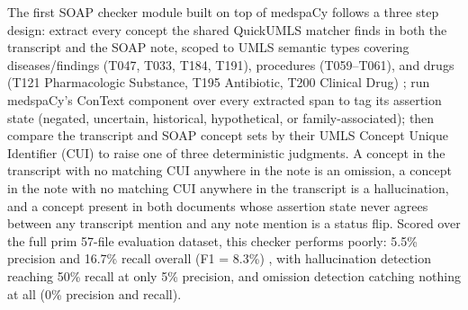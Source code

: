 \documentclass[11pt,a4paper]{article}
\begin{document}
The first SOAP checker module built on top of medspaCy follows a three step design: extract every concept the shared QuickUMLS matcher finds in both the transcript and the SOAP note, scoped to UMLS semantic types covering diseases/findings (T047, T033, T184, T191), procedures (T059–T061), and drugs (T121 Pharmacologic Substance, T195 Antibiotic, T200 Clinical Drug) \cite{soldaini2016quickumls} ; run medspaCy's ConText component over every extracted span to tag its assertion state (negated, uncertain, historical, hypothetical, or family-associated); then compare the transcript and SOAP concept sets by their UMLS Concept Unique Identifier (CUI) to raise one of three deterministic judgments.
A concept in the transcript with no matching CUI anywhere in the note is an omission,
a concept in the note with no matching CUI anywhere in the transcript is a hallucination, and a concept present in both documents whose assertion state never agrees between any transcript mention and any note mention is a status flip. 
Scored over the full prim 57-file evaluation dataset, this checker performs poorly: 5.5\% precision and 16.7\% recall overall (F1 = 8.3\%) , with hallucination detection reaching 50\% recall at only 5\% precision, and omission detection catching nothing at all (0\% precision and recall).
\end{document}
